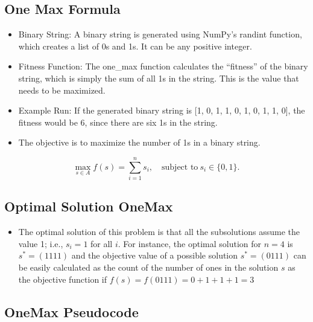 \documentclass[
  letterpaper,
  DIV=11,
  numbers=noendperiod]{scrreprt}
\providecommand{\tightlist}{%
  \setlength{\itemsep}{0pt}\setlength{\parskip}{0pt}}\usepackage{longtable,booktabs,array}
\begin{document}
\subsection{One Max Formula}\label{one-max-formula}

\begin{itemize}
\tightlist
\item
  Binary String: A binary string is generated using NumPy's randint
  function, which creates a list of 0s and 1s. It can be any positive
  integer.
\item
  Fitness Function: The one\_max function calculates the ``fitness'' of
  the binary string, which is simply the sum of all 1s in the string.
  This is the value that needs to be maximized.
\item
  Example Run: If the generated binary string is {[}1, 0, 1, 1, 0, 1, 0,
  1, 1, 0{]}, the fitness would be 6, since there are six 1s in the
  string.
\item
  The objective is to maximize the number of 1s in a binary string.
\end{itemize}

\[\max_{s \in A} f(s) = \sum_{i=1}^{n} s_i, \quad \text{subject to} \ s_i \in \{0, 1\}.\]

\subsection{Optimal Solution OneMax}\label{optimal-solution-onemax}

\begin{itemize}
\tightlist
\item
  The optimal solution of this problem is that all the subsolutions
  assume the value 1; i.e., \(s_i=1\) for all \(i\). For instance, the
  optimal solution for \(n=4\) is \(s^*=(1111)\) and the objective value
  of a possible solution \(s^*=(0111)\) can be easily calculated as the
  count of the number of ones in the solution \(s\) as the objective
  function if \(f(s) = f(0111) = 0+1+1+1 = 3\)
\end{itemize}

\subsection{OneMax Pseudocode}\label{onemax-pseudocode}
\end{document}
